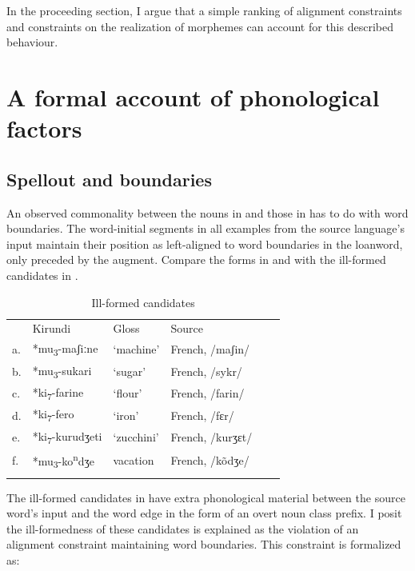 \documentclass[output=paper,colorlinks,citecolor=brown,
]{langscibook}
\begin{document}
In the proceeding section, I argue that a simple ranking of alignment constraints and constraints on the realization of morphemes can account for this described behaviour. 

\section{A formal account of phonological factors} \label{sec:kinchsular:formalaccount}

\subsection{Spellout and boundaries} \label{sec:kinchsular:spellout}

An observed commonality between the nouns in  and those in  has to do with word boundaries. The word-initial segments in all examples from the source language’s input maintain their position as left-aligned to word boundaries in the loanword, only preceded by the augment. Compare the forms in  and  with the ill-formed candidates in . 

\begin{table}
\caption{Ill-formed candidates}
\label{tab:kinchsular:illformed1}
\begin{tabular}{llllll}
  \lsptoprule
        & {Kirundi} & {Gloss} & {Source} \\
         a. & *mu\textsubscript{3}-maʃiːne & `machine' & French, /maʃin/ \\
            b. & *mu\textsubscript{3}-sukari & `sugar' & French, /sykr/ \\ 
            c. & *ki\textsubscript{7}-farine & `flour' & French, /farin/  \\
            d. & *ki\textsubscript{7}-fero & `iron' & French, /fɛr/ \\
            e. & *ki\textsubscript{7}-kurudʒeti & `zucchini' & French, /kurʒɛt/ \\
           f. & *mu\textsubscript{3}-ko\textsuperscript{n}dʒe & vacation & French, /k\~{o}dʒe/ \\
  \lspbottomrule
\end{tabular}
\end{table}

The ill-formed candidates in  have extra phonological material between the source word’s input and the word edge in the form of an overt noun class prefix. I posit the ill-formedness of these candidates is explained as the violation of an alignment constraint maintaining word boundaries. This constraint is formalized as:
\end{document}

